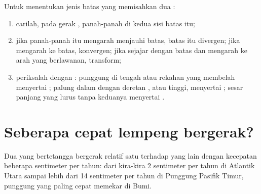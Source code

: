 \begin{method}\label{met:g7:plate-tectonics:recognise}
Untuk menentukan jenis batas yang memisahkan dua :
\begin{enumerate}
  \item carilah, pada  gerak , panah-panah di kedua sisi batas
        itu;
  \item jika panah-panah itu mengarah menjauhi batas, batas itu divergen;
        jika mengarah ke batas, konvergen; jika sejajar dengan batas dan
        mengarah ke arah yang berlawanan, transform;
  \item periksalah dengan : punggung di tengah  atau
        rekahan yang membelah  menyertai ; palung dalam
        dengan deretan , atau  tinggi, menyertai ; sesar panjang yang lurus tanpa keduanya menyertai .
\end{enumerate}
\end{method}

\section{Seberapa cepat lempeng bergerak?}

\begin{proposition}\label{prop:g7:plate-tectonics:speed}
Dua  yang bertetangga bergerak relatif satu terhadap yang lain
dengan kecepatan beberapa sentimeter per tahun: dari kira-kira
2 sentimeter per tahun di Atlantik Utara sampai lebih dari 14 sentimeter
per tahun di Punggung Pasifik Timur, punggung  yang paling cepat
memekar di Bumi.
\end{proposition}

